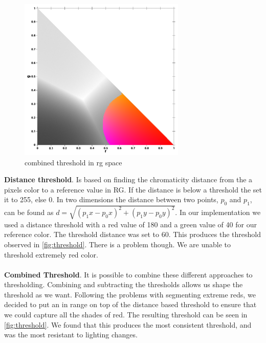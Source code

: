 \begin{multicols}{2}
	\begin{figure}[H]
		\centering
		\includegraphics[width=1\linewidth]{figure/Analysis/thresholdcolor.png}
		\caption{combined threshold in rg space}
		\label{fig:threshold}
	\end{figure}	
\end{multicols}
\textbf{Distance threshold}. Is based on finding the chromaticity distance from the a pixels color to a reference value in RG. If the distance is below a threshold the set it to 255, else 0. In two dimensions the distance between two points, $p_0$ and $p_1$, can be found as $d = \sqrt{(p_1x - p_0x)^2 +(p_1y - p_0y)^2}$. In our implementation we used a distance threshold with a red value of 180 and a green value of 40 for our reference color. The threshold distance was set to 60. This produces the threshold observed in \autoref{fig:threshold}. There is a problem though. We are unable to threshold extremely red color.\\\\
\textbf{Combined Threshold}. It is possible to combine these different approaches to thresholding. Combining and subtracting the thresholds allows us shape the threshold as we want. Following the problems with segmenting extreme reds, we decided to put an in range on top of the distance based threshold to ensure that we could capture all the shades of red. The resulting threshold can be seen in \autoref{fig:threshold}. We found that this produces the most consistent threshold, and was the most resistant to lighting changes.

